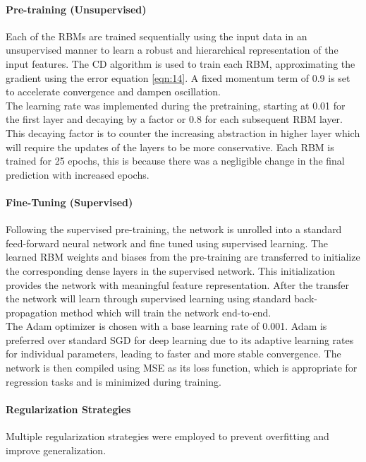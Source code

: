  \paragraph{Pre-training (Unsupervised)}Each of the RBMs are trained sequentially using the input data in an unsupervised manner to learn a robust and hierarchical representation of the input features. The CD algorithm is used to train each RBM, approximating the gradient using the error equation \ref{eqn:14}. A fixed momentum term of 0.9 is set to accelerate convergence and dampen oscillation.\\ The learning rate was implemented during the pretraining, starting at 0.01 for the first layer and decaying by a factor or 0.8 for each subsequent RBM layer. This decaying factor is to counter the increasing abstraction in higher layer which will require the updates of the layers to be more conservative. Each RBM is trained for 25 epochs, this is because there was a negligible change in the final prediction with increased epochs.
 
 \paragraph{Fine-Tuning (Supervised)} Following the supervised pre-training, the network is unrolled into a standard feed-forward neural network and fine tuned using supervised learning. The learned RBM weights and biases from the pre-training are transferred to initialize the corresponding dense layers in the supervised network. This initialization provides the network with meaningful feature representation. After the transfer the network will learn through supervised learning using standard back-propagation method which will train the network end-to-end.
 \\
 The Adam optimizer is chosen with a base learning rate of 0.001. Adam is preferred over standard SGD for deep learning due to its adaptive learning rates for individual parameters, leading to faster and more stable convergence. The network is then compiled using MSE as its loss function, which is appropriate for regression tasks and is minimized during training.
 
 \paragraph{Regularization Strategies}
 Multiple regularization strategies were employed to prevent overfitting and improve generalization.
 
